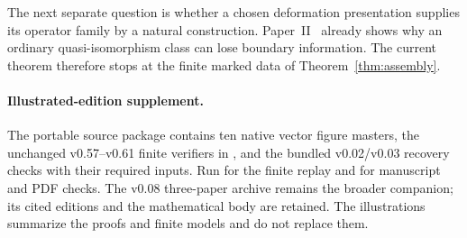 \documentclass[11pt]{amsart}
\theoremstyle{definition}
\begin{document}
The next separate question is whether a chosen deformation presentation supplies
its operator family by a natural construction. Paper~II~\cite{PaperII} already
shows why an ordinary quasi-isomorphism class can lose boundary information.
The current theorem therefore stops at the finite marked data of
Theorem~\ref{thm:assembly}.


\paragraph{Illustrated-edition supplement.}
The portable source package contains ten native vector figure masters,
the unchanged v0.57--v0.61 finite verifiers in
, and the bundled v0.02/v0.03
recovery checks with their required inputs. Run 
for the finite replay and  for manuscript and
PDF checks. The v0.08 three-paper archive remains the broader companion;
its cited editions and the mathematical body are retained. The illustrations
summarize the proofs and finite models and do not replace them.
\end{document}

